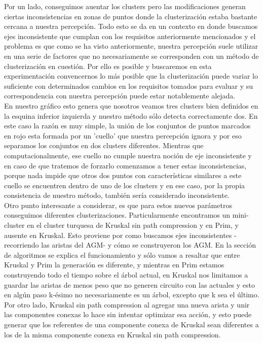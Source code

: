 \documentclass[11pt,a4paper]{article}
\begin{document}
Por un lado, conseguimos auentar los clusters pero las modificaciones generan ciertas inconsistencias en zonas de puntos donde la clusterización estaba bastante cercana a nuestra percepción. Todo esto se da en un contexto en donde buscamos ejes inconsistente que cumplan con los requisitos anteriormente mencionados y el problema es que como se ha visto anteriormente, nuestra percepción suele utilizar en una serie de factores que no necesariamente se corresponden con un método de clusterización en cuestión. Por ello es posible y buscaremos en esta experimentación convencernos lo más posible que la clusterización puede variar lo suficiente con determinados cambios en los requisitos tomados para evaluar y su correspondencia con nuestra percepción puede estar notablemente alejada.
\\ En nuestro gráfico esto genera que nosotros veamos tres clusters bien definidos en la esquina inferior izquierda y nuestro método sólo detecta correctamente dos. En este caso la razón es muy simple, la unión de los conjuntos de puntos marcados en rojo esta formada por un 'cuello' que nuestra percepción ignora y por eso separamos los conjuntos en dos clusters diferentes. Mientras que computacionalmente, ese cuello no cumple nuestra noción de eje inconsistente y en caso de que tratemos de forzarlo comenzamos a tener estas inconsistencias, porque nada impide que otros dos puntos con características similares a este cuello se encuentren dentro de uno de los clusters y en ese caso, por la propia consistencia de nuestro método, también sería considerado inconsistente.\\
Otro punto interesante a considerar, es que para estos nuevos parámetros conseguimos diferentes clusterizaciones. Particularmente encontramos un mini-cluster en el cluster turquesa de Kruskal sin path compression y en Prim, y ausente en Kruskal. Esto proviene por como buscamos ejes inconsistentes -recorriendo las aristas del AGM- y cómo se construyeron los AGM. En la sección de algoritmos se explica el funcionamiento y sólo vamos a resaltar que entre Kruskal y Prim la generación es diferente, y mientras en Prim estamos construyendo todo el tiempo sobre el árbol actual, en Kruskal nos limitamos a guardar las aristas de menos peso que no generen circuito con las actuales y esto en algún paso k-ésimo no necesariamente es un árbol, excepto que k sea el último. Por otro lado, Kruskal sin path compression al agregar una nueva arista y unir las componentes conexas lo hace sin intentar optimizar esa acción, y esto puede generar que los referentes de una componente conexa de Kruskal sean diferentes a los de la misma componente conexa en Kruskal sin path compression.
\end{document}

